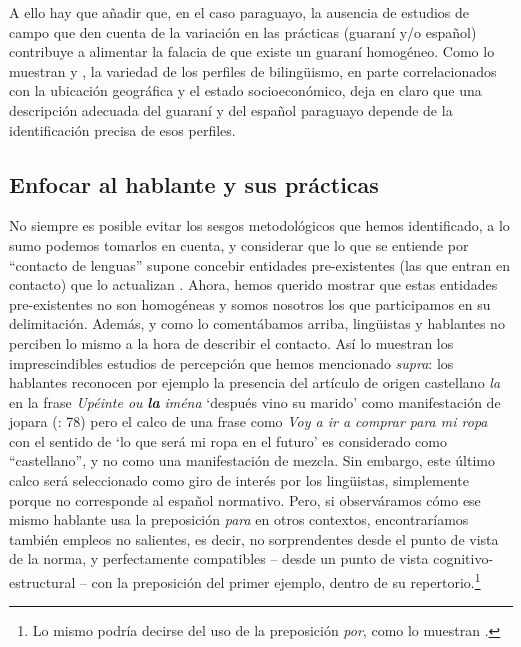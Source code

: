 \documentclass[output=paper]{langscibook}
\begin{document}
\begin{itemize}
\end{itemize}

A ello hay que añadir que, en el caso paraguayo, la ausencia de estudios de campo que den cuenta de la variación en las prácticas (guaraní y/o español) contribuye a alimentar la falacia de que existe un guaraní homogéneo. Como lo muestran \citet{Penner2014} y  \citet{FernándezBarrera2015}, la variedad de los perfiles de bilingüismo, en parte correlacionados con la ubicación geográfica y el estado socioeconómico, deja en claro que una descripción adecuada del guaraní y del español paraguayo depende de la identificación precisa de esos perfiles.

 \subsection{Enfocar al hablante y sus prácticas}


No siempre es posible evitar los sesgos metodológicos que hemos identificado, a lo sumo podemos tomarlos en cuenta, y considerar que lo que se entiende por “contacto de lenguas” supone concebir entidades pre-existentes (las que entran en contacto) que lo actualizan \citep{Nicolaï2017}. Ahora, hemos querido mostrar que estas entidades pre-existentes no son homogéneas y somos nosotros los que participamos en su delimitación. Además, y como lo comentábamos arriba, lingüistas y hablantes no perciben lo mismo a la hora de describir el contacto. Así lo muestran los imprescindibles estudios de percepción que hemos mencionado \textit{supra}: los hablantes reconocen por ejemplo la presencia del artículo de origen castellano \textit{la} en la frase \textit{Upéinte ou} \textbf{\textit{la}} \textit{iména} ‘después vino su marido’ como manifestación de jopara (\citealt{Zajícová2009}: 78) pero el calco de una frase como \textit{Voy a ir a comprar para mi ropa} con el sentido de ‘lo que será mi ropa en el futuro’ es considerado como “castellano”, y no como una manifestación de mezcla. Sin embargo, este último calco será seleccionado como giro de interés por los lingüistas, simplemente porque no corresponde al español normativo. Pero, si observáramos cómo ese mismo hablante usa la preposición \textit{para} en otros contextos, encontraríamos también empleos no salientes, es decir, no sorprendentes desde el punto de vista de la norma, y perfectamente compatibles -- desde un punto de vista cognitivo-estructural -- con la preposición del primer ejemplo, dentro de su repertorio.\footnote{Lo mismo podría decirse del uso de la preposición \textit{por}, como lo muestran   \citet{BlestelFontanier2017}.}
\end{document}
